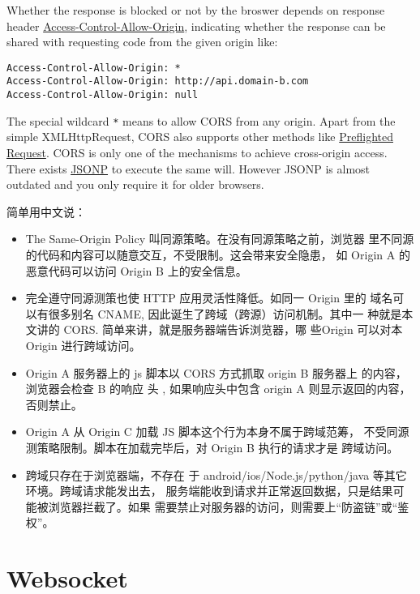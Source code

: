Whether the response is blocked or not by the broswer depends on
response header \uline{Access-Control-Allow-Origin}, indicating
whether the response can be shared with requesting code from the
given origin like:

\begin{lstlisting}
Access-Control-Allow-Origin: *
Access-Control-Allow-Origin: http://api.domain-b.com
Access-Control-Allow-Origin: null
\end{lstlisting}

The special wildcard \verb|*| means to allow CORS from any
origin. Apart from the simple XMLHttpRequest, CORS also supports
other methods like
\href{https://developer.mozilla.org/en-US/docs/Web/HTTP/CORS#Preflighted_requests}{Preflighted
  Request}. CORS is only one of the mechanisms to achieve
cross-origin access. There exists
\href{https://stackoverflow.com/q/2067472}{JSONP} to execute the
same will. However JSONP is almost outdated and you only require
it for older browsers.

简单用中文说：

\begin{itemize}
\item The Same-Origin Policy 叫同源策略。在没有同源策略之前，浏览器
  里不同源的代码和内容可以随意交互，不受限制。这会带来安全隐患，
  如 Origin A 的恶意代码可以访问 Origin B 上的安全信息。
\item 完全遵守同源测策也使 HTTP 应用灵活性降低。如同一 Origin 里的
  域名可以有很多别名 CNAME, 因此诞生了跨域（跨源）访问机制。其中一
  种就是本文讲的 CORS. 简单来讲，就是服务器端告诉浏览器，哪
  些Origin 可以对本 Origin 进行跨域访问。
\item Origin A 服务器上的 js 脚本以 CORS 方式抓取 origin B 服务器上
  的内容，浏览器会检查 B 的响应
  头 , 如果响应头中包含 origin A
  则显示返回的内容，否则禁止。
\item Origin A 从 Origin C 加载 JS 脚本这个行为本身不属于跨域范筹，
  不受同源测策略限制。脚本在加载完毕后，对 Origin B 执行的请求才是
  跨域访问。
\item 跨域只存在于浏览器端，不存在
  于 android/ios/Node.js/python/java 等其它环境。跨域请求能发出去，
  服务端能收到请求并正常返回数据，只是结果可能被浏览器拦截了。如果
  需要禁止对服务器的访问，则需要上“防盗链”或“鉴权”。
\end{itemize}

\section{Websocket}
\label{sec:websocket}


